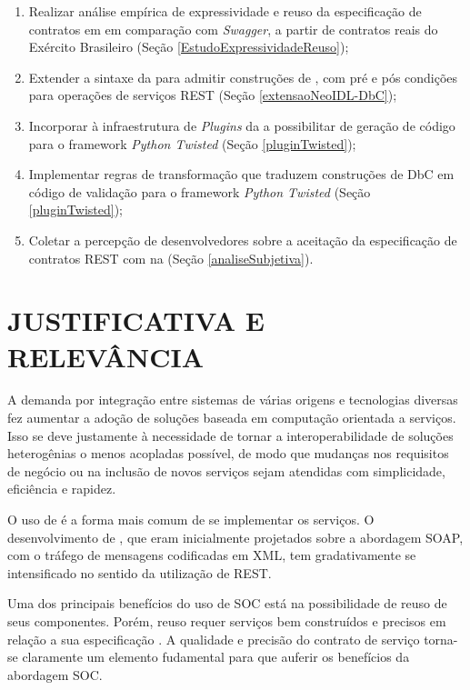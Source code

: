 \begin{enumerate}[(OE1)]
  \item Realizar análise empírica de expressividade e reuso da especificação de
  contratos em \neoidl{} em comparação com \textit{Swagger}, a partir de contratos
  reais do Exército Brasileiro (Seção \ref{EstudoExpressividadeReuso}); 
  \item Extender a sintaxe da \neoidl{} para admitir construções de 
  \designbycontract, com pré e pós condições para operações de serviços REST
  (Seção \ref{extensaoNeoIDL-DbC});
  \item Incorporar à infraestrutura de \textit{Plugins} da
  \neoidl{} a possibilitar de geração de código para o framework \textit{Python
 Twisted} (Seção \ref{pluginTwisted});
  \item Implementar regras de transformação que traduzem construções de DbC
 \neoidl{} em código de validação para o framework \textit{Python
 Twisted} (Seção \ref{pluginTwisted});%
  \item Coletar a percepção de desenvolvedores sobre a aceitação da
  especificação de contratos REST com \designbycontract{} na \neoidl{} (Seção
  \ref{analiseSubjetiva}).
\end{enumerate}


\section{JUSTIFICATIVA E RELEVÂNCIA}
\label{JustificativaRelevancia}
\vspace{-6mm}

A demanda por integração entre sistemas de várias origens e tecnologias diversas
fez aumentar a adoção de soluções baseada em computação orientada a serviços.
Isso se deve justamente à necessidade de tornar a interoperabilidade de soluções
heterogênias o menos acopladas possível, de modo que mudanças nos requisitos de negócio ou
na inclusão de novos serviços sejam atendidas com simplicidade,
eficiência e rapidez.

O uso de \ws{}\cite{erl2009web} é a forma mais comum de se implementar os serviços. O
desenvolvimento de \ws{}, que eram inicialmente projetados sobre a abordagem
SOAP, com o tráfego de mensagens codificadas em XML\cite{XML}, tem gradativamente
se intensificado no sentido da utilização de REST\cite{fielding2000architectural}.

Uma dos principais benefícios do uso de SOC está na possibilidade de reuso de
seus componentes. Porém, reuso requer serviços bem construídos e precisos em
relação a sua especificação \cite{jazequel1997design}. A qualidade e precisão do
contrato de serviço torna-se claramente um elemento fudamental para que auferir
os benefícios da abordagem SOC.


